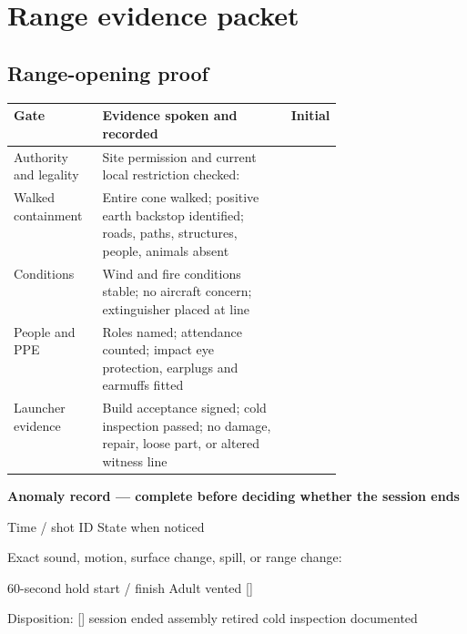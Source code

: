 
\clearpage
\section{Range evidence packet}
\subsection{Range-opening proof}
\begin{tabularx}{\linewidth}{@{}p{0.27\linewidth}L p{0.15\linewidth}@{}}
\toprule \textbf{Gate} & \textbf{Evidence spoken and recorded} & \textbf{Initial}\\
\midrule
Authority and legality & Site permission and current local restriction checked:
\hrulefill &\\[.8em]
Walked containment & Entire cone walked; positive earth backstop identified;
roads, paths, structures, people, animals absent &\\[.8em]
Conditions & Wind and fire conditions stable; no aircraft concern; extinguisher
placed at line &\\[.8em]
People and PPE & Roles named; attendance counted; impact eye protection,
earplugs and earmuffs fitted &\\[.8em]
Launcher evidence & Build acceptance signed; cold inspection passed; no damage,
repair, loose part, or altered witness line &\\
\bottomrule
\end{tabularx}

\begin{telosframe}
\textbf{Anomaly record — complete before deciding whether the session ends}\par
Time / shot ID \hrulefill\quad State when noticed \hrulefill\par
\vspace{.55em}
Exact sound, motion, surface change, spill, or range change:
\hrulefill\par\vspace{.55em}
60-second hold start / finish \hrulefill\quad Adult vented [\quad]\par
\vspace{.55em}
Disposition: [\quad] session ended \quad [\quad] assembly retired
\quad [\quad] cold inspection documented
\end{telosframe}

